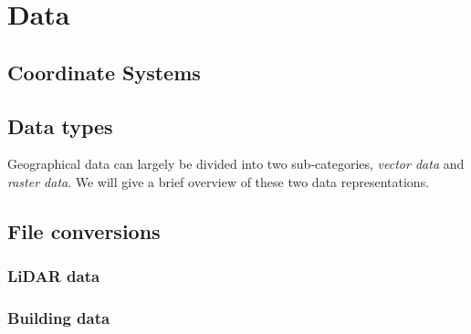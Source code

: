 \section{Data}



\subsection{Coordinate Systems}


\subsection{Data types}

Geographical data can largely be divided into two sub-categories, \textit{vector data} and \textit{raster data}.
We will give a brief overview of these two data representations.



\subsection{File conversions}

\subsubsection{LiDAR data}


\subsubsection{Building data}

